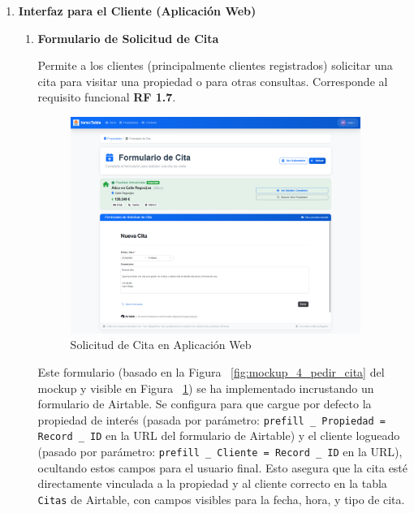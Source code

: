 \begin{enumerate}

    \item \textbf{Interfaz para el Cliente (Aplicación Web)}

    \begin{enumerate}

        \item \textbf{Formulario de Solicitud de Cita}

        Permite a los clientes (principalmente clientes registrados) solicitar una cita para visitar una propiedad o para otras consultas. Corresponde al requisito funcional \textbf{RF 1.7}.

        \begin{figure}[H]
            \begin{center}
                \includegraphics[width = 0.95\textwidth]{Figuras/formulariopedircita.png}
            \end{center}
            \caption{\label{fig:formulariopedircita} Solicitud de Cita en Aplicación Web}
        \end{figure}

\clearpage

        Este formulario (basado en la Figura ~\ref{fig:mockup_4_pedir_cita} del mockup y visible en Figura ~\ref{fig:formulariopedircita}) se ha implementado incrustando un formulario de Airtable. Se configura para que cargue por defecto la propiedad de interés (pasada por parámetro: \texttt{prefill \_ Propiedad = Record \_ ID} en la URL del formulario de Airtable) y el cliente logueado (pasado por parámetro: \texttt{prefill \_ Cliente = Record \_ ID} en la URL), ocultando estos campos para el usuario final. Esto asegura que la cita esté directamente vinculada a la propiedad y al cliente correcto en la tabla \texttt{Citas} de Airtable, con campos visibles para la fecha, hora, y tipo de cita.
        

\end{enumerate}
\end{enumerate}
